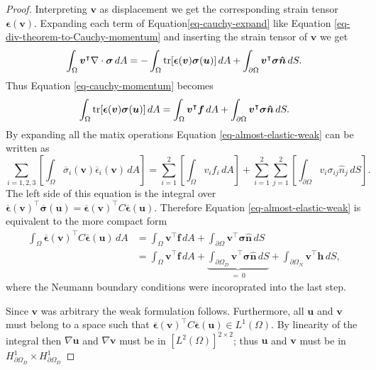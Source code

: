 \documentclass[5pt,a4paper,english]{elsarticle}%
\begin{document}
\begin{proof}
Interpreting $\boldsymbol{v}$ as displacement we get the corresponding strain tensor $\boldsymbol{\epsilon} (\boldsymbol v)$. Expanding each term of Equation\eqref{eq-cauchy-expand} like Equation \eqref{eq-div-theorem-to-Cauchy-momentum} and inserting the strain tensor of $\boldsymbol{v}$ we get
\begin{equation}\label{eq-elastic-weak-left}
    \int_\Omega{\boldsymbol{v}^\intercal \nabla \cdot \boldsymbol{\sigma}} \,dA = -\int_\Omega{\tr[ \boldsymbol{\epsilon}(\boldsymbol v)\boldsymbol{\sigma}(\boldsymbol u)]} \,dA + \int_{\partial \Omega}{\boldsymbol{v}^\intercal \boldsymbol{\sigma}}\boldsymbol{\hat{n} } \,dS.
\end{equation}
Thus Equation \eqref{eq-cauchy-momentum} becomes
\begin{equation} \label{eq-almost-elastic-weak}
    \int_\Omega{\tr[ \boldsymbol{\epsilon}(\boldsymbol v)\boldsymbol{\sigma}(\boldsymbol u)]} \,dA  = \int_\Omega{\boldsymbol{v}^\intercal    \boldsymbol{f}} \,dA + \int_{\partial \Omega}{\boldsymbol{v}^\intercal \boldsymbol{\sigma}}\boldsymbol{\hat{n} } \,dS.
\end{equation}
By expanding all the matix operations Equation \eqref{eq-almost-elastic-weak} can be written as 
\begin{equation}
    \sum_{i = 1,2,3} \left[\int_\Omega{ \overline{\sigma}_i(\boldsymbol v) \overline{\epsilon}_i(\boldsymbol v)}   \,dA \right] = \sum_{i = 1}^2 \left[\int_\Omega{ v_i f_i}   \,dA \right] + \sum_{i = 1}^{2}{{\sum_{j = 1}^{2} \left[\int_{\partial \Omega}{ v_i \sigma_{ij} \hat{n}_j}   \,dS \right]}}. 
\end{equation}
The left side of this equation is the integral over $\boldsymbol{\overline \epsilon}(\boldsymbol v)^\intercal \boldsymbol{\overline \sigma}(\boldsymbol u) = \boldsymbol{\overline \epsilon}(\boldsymbol v)^\intercal C\boldsymbol{\overline \epsilon}(\boldsymbol u)$. Therefore Equation \eqref{eq-almost-elastic-weak} is equivalent to the more compact form
\begin{align}
    \int_\Omega{ \boldsymbol{\overline \epsilon}(\boldsymbol v)^\intercal C\boldsymbol{\overline \epsilon}(\boldsymbol u)} \,dA  &=\int_\Omega{\boldsymbol{v}^\intercal \boldsymbol{f}} \,dA + \int_{\partial \Omega}{\boldsymbol{v}^\intercal \boldsymbol{\sigma}}\boldsymbol{\hat{n} } \,dS  \\
    &= \int_\Omega{\boldsymbol{v}^\intercal \boldsymbol{f}} \,dA + \underbrace{\int_{\partial \Omega_D}{\boldsymbol{v}^\intercal \boldsymbol{\sigma}}\boldsymbol{\hat{n} } \,dS}_{= \ 0} + \int_{\partial \Omega_N}{\boldsymbol{v}^\intercal \boldsymbol h} \,dS,
\end{align}
where the Neumann boundary conditions were incoroprated into the last step.

Since $\bm v$ was arbitrary the weak formulation follows. Furthermore, all $\bm u$ and $\bm v$ must belong to a space such that $\boldsymbol{\overline \epsilon}(\boldsymbol v)^\intercal C\boldsymbol{\overline \epsilon}(\boldsymbol u) \in {L^1}(\Omega)$. By linearity of the integral then $\nabla \bm u$ and $\nabla \bm v$ must be in $\left[{L^2}(\Omega)\right]^{2 \times 2}$; thus $\bm u$ and $\bm v$ must be in $ H^1_{\partial \Omega_D } \times H^1_{\partial \Omega_D } $
\end{proof}
\end{document}
